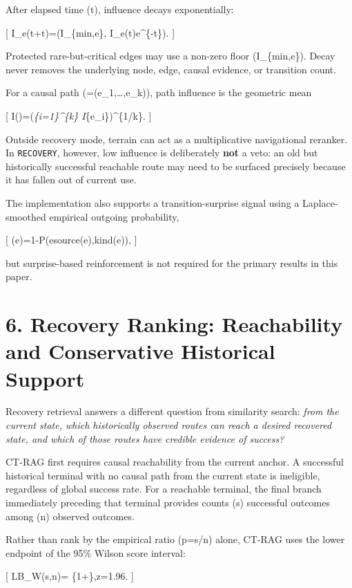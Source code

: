 \documentclass[
  11pt,
]{article}
\begin{document}
After elapsed time (\Delta t), influence decays exponentially:

{[} I\_e(t+\Delta t)=\max(I\_\{min,e\}, I\_e(t)e\^{}\{-\mu\Delta t\}).
{]}

Protected rare-but-critical edges may use a non-zero floor
(I\_\{min,e\}). Decay never removes the underlying node, edge, causal
evidence, or transition count.

For a causal path (\pi=(e\_1,\ldots,e\_k)), path influence is the
geometric mean

{[} I(\pi)=\left(\prod\emph{\{i=1\}\^{}\{k\}
I}\{e\_i\}\right)\^{}\{1/k\}. {]}

Outside recovery mode, terrain can act as a multiplicative navigational
reranker. In \texttt{RECOVERY}, however, low influence is deliberately
\textbf{not} a veto: an old but historically successful reachable route
may need to be surfaced precisely because it has fallen out of current
use.

The implementation also supports a transition-surprise signal using a
Laplace-smoothed empirical outgoing probability,

{[} (e)=1-P(e\mid source(e),kind(e)), {]}

but surprise-based reinforcement is not required for the primary results
in this paper.

\section{6. Recovery Ranking: Reachability and Conservative Historical
Support}\label{recovery-ranking-reachability-and-conservative-historical-support}

Recovery retrieval answers a different question from similarity search:
\emph{from the current state, which historically observed routes can
reach a desired recovered state, and which of those routes have credible
evidence of success?}

CT-RAG first requires causal reachability from the current anchor. A
successful historical terminal with no causal path from the current
state is ineligible, regardless of global success rate. For a reachable
terminal, the final branch immediately preceding that terminal provides
counts (s) successful outcomes among (n) observed outcomes.

Rather than rank by the empirical ratio (\hat p=s/n) alone, CT-RAG uses
the lower endpoint of the 95\% Wilson score interval:

{[} LB\_W(s,n)=
\{1+\},\qquad z=1.96. {]}
\end{document}
